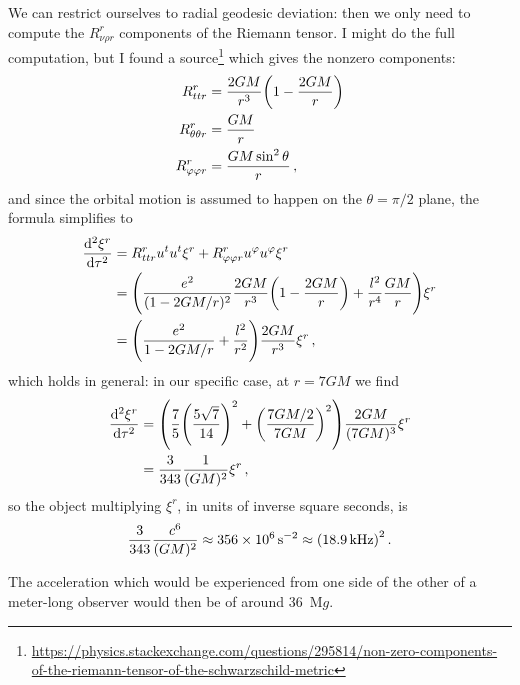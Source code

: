 \documentclass[main.tex]{subfiles}
\begin{document}
We can restrict ourselves to radial geodesic deviation: then we only need to compute the \(R^{r}_{\nu \rho r}\) components of the Riemann tensor. 
I might do the full computation, but I found a source\footnote{\url{https://physics.stackexchange.com/questions/295814/non-zero-components-of-the-riemann-tensor-of-the-schwarzschild-metric}} which gives the nonzero components: 
%
\begin{subequations}
\begin{align}
  R^{r}_{ttr} &= \frac{2GM}{r^3} \qty(1 - \frac{2GM}{r}) \\
  R^{r}_{\theta \theta r} &= \frac{GM}{r} \\
  R^{r}_{\varphi \varphi r} &= \frac{G M \sin^2\theta}{r} 
\,,
\end{align}
\end{subequations}
%
and since the orbital motion is assumed to happen on the \(\theta = \pi /2\) plane, the formula simplifies to 
%
\begin{subequations}
\begin{align}
  \dv[2]{\xi^{r}}{\tau } &= R^{r}_{ttr} u^{t} u^{t} \xi^{r} 
  + R^{r }_{\varphi \varphi r} u^{\varphi } u^{\varphi } \xi^{r}  \\
  &= \qty(\frac{e^2}{(1-2GM/r)^2} \frac{2GM}{r^{3}}\qty(1 - \frac{2GM}{r}) +  \frac{l^2}{r^{4}} \frac{GM}{r}) \xi^{r}  \\
  &= \qty(\frac{e^2}{1-2GM/r} + \frac{l^2}{r^2} ) \frac{2GM}{r^3} \xi^{r}
\,,
\end{align}
\end{subequations}
%
which holds in general: in our specific case, at \(r = 7GM \) we find 
%
\begin{subequations}
\begin{align}
  \dv[2]{\xi^{r}}{\tau } &= \qty(\frac{7}{5} \qty(\frac{5 \sqrt{7}}{14})^2 + \qty(\frac{7GM/2}{7GM})^2 ) \frac{2GM}{(7GM)^3}  \xi^{r}  \\
  &= \frac{3}{343} \frac{1}{(GM)^2} \xi^{r}
\,,
\end{align}
\end{subequations}
%
so the object multiplying \(\xi^{r}\), in units of inverse square seconds, is 
%
\begin{align}
  \frac{3}{343} \frac{c^{6}}{(GM)^2} \approx \SI{356e6}{s^{-2}}
  \approx \qty(\SI{18.9}{kHz})^2
\,. 
\end{align}

The acceleration which would be experienced from one side of the other of a meter-long observer would then be of around \SI{36}{M}\(g\). 
\end{document}
